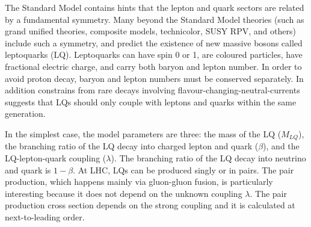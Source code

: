 \documentclass[epj]{webofc}
\begin{document}
The Standard Model contains hints that the lepton and quark sectors
are related by a fundamental symmetry. Many beyond the Standard Model
theories (such as grand unified theories, composite models,
technicolor, SUSY RPV, and others) include such a symmetry, 
and predict the existence of new massive bosons called leptoquarks (LQ).
Leptoquarks can have spin 0 or 1, are coloured particles, have
fractional electric charge, and carry both baryon and lepton number.
In order to avoid proton decay, baryon and lepton numbers must be
conserved separately. In addition constrains from rare decays involving
flavour-changing-neutral-currents suggests that LQs should only couple
with leptons and quarks within the same generation. 

In the simplest
case, the model parameters are three: the mass of the LQ ($M_{LQ}$), the branching
ratio of the LQ decay into charged lepton and quark ($\beta$), and the 
LQ-lepton-quark coupling ($\lambda$). The branching ratio of the LQ
decay into neutrino and quark is $1-\beta$. At LHC, LQs can be produced singly
or in pairs. The pair production, which happens mainly via gluon-gluon
fusion, is particularly interesting because it does not depend on the
unknown coupling $\lambda$. The pair production cross section depends on 
the strong coupling and it is calculated at next-to-leading order.
\end{document}
